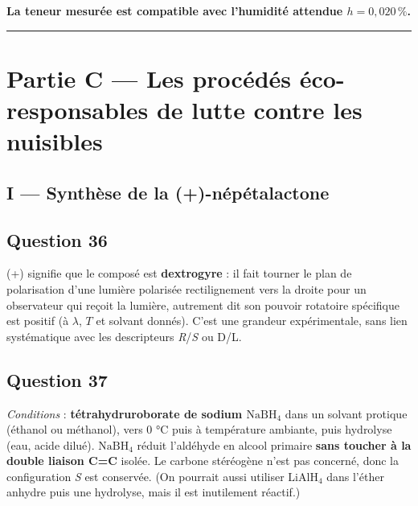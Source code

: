 \documentclass[11pt,a4paper]{article}
\newcommand{\equationajustee}[1]{%
  \sbox{\boiteequation}{$\displaystyle #1$}%
  \ifdim\wd\boiteequation>\linewidth
    \[\resizebox{\linewidth}{!}{\usebox{\boiteequation}}\]%
  \else
    \[#1\]%
  \fi}
\begin{document}
\equationajustee{\boxed{E_N\approx0{,}28<2}}

\textbf{La teneur mesurée est compatible avec l'humidité attendue \(h=0{,}020\,\%\).}

\begin{center}\rule{0.5\linewidth}{0.5pt}\end{center}

\hypertarget{partie-c-les-procuxe9duxe9s-uxe9co-responsables-de-lutte-contre-les-nuisibles}{%
\section{Partie C --- Les procédés éco-responsables de lutte contre les nuisibles}\label{partie-c-les-procuxe9duxe9s-uxe9co-responsables-de-lutte-contre-les-nuisibles}}

\hypertarget{i-synthuxe8se-de-la--nuxe9puxe9talactone}{%
\subsection{I --- Synthèse de la (+)-népétalactone}\label{i-synthuxe8se-de-la--nuxe9puxe9talactone}}

\hypertarget{question-36}{%
\subsection{Question 36}\label{question-36}}

(+) signifie que le composé est \textbf{dextrogyre} : il fait tourner le plan de polarisation d'une lumière polarisée rectilignement vers la droite pour un observateur qui reçoit la lumière, autrement dit son pouvoir rotatoire spécifique est positif (à \(\lambda\), \(T\) et solvant donnés). C'est une grandeur expérimentale, sans lien systématique avec les descripteurs \emph{R}/\emph{S} ou D/L.

\hypertarget{question-37}{%
\subsection{Question 37}\label{question-37}}

\emph{Conditions} : \textbf{tétrahydruroborate de sodium \(\mathrm{NaBH_4}\)} dans un solvant protique (éthanol ou méthanol), vers 0 °C puis à température ambiante, puis hydrolyse (eau, acide dilué). \(\mathrm{NaBH_4}\) réduit l'aldéhyde en alcool primaire \textbf{sans toucher à la double liaison C=C} isolée. Le carbone stéréogène n'est pas concerné, donc la configuration \emph{S} est conservée. (On pourrait aussi utiliser \(\mathrm{LiAlH_4}\) dans l'éther anhydre puis une hydrolyse, mais il est inutilement réactif.)
\end{document}
